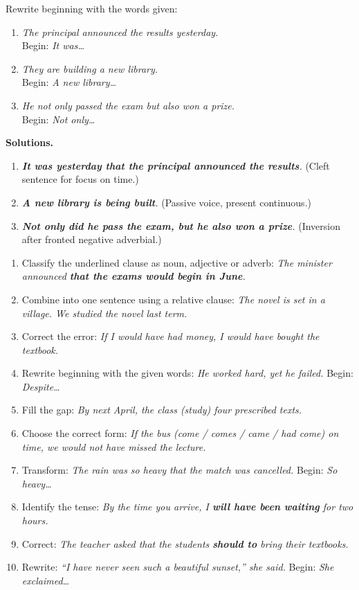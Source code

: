 \documentclass[11pt]{article}
\begin{document}
\begin{exoresolu}
Rewrite beginning with the words given:
\begin{enumerate}
\item \emph{The principal announced the results yesterday.} \\ Begin: \emph{It was\ldots}
\item \emph{They are building a new library.} \\ Begin: \emph{A new library\ldots}
\item \emph{He not only passed the exam but also won a prize.} \\ Begin: \emph{Not only\ldots}
\end{enumerate}
\tcblower
\textbf{Solutions.}
\begin{enumerate}
\item \emph{\textbf{It was yesterday that the principal announced the results}.} (Cleft sentence for focus on time.)
\item \emph{\textbf{A new library is being built}.} (Passive voice, present continuous.)
\item \emph{\textbf{Not only did he pass the exam, but he also won a prize}.} (Inversion after fronted negative adverbial.)
\end{enumerate}
\end{exoresolu}

\begin{exercice}
\begin{enumerate}
\item Classify the underlined clause as noun, adjective or adverb: \emph{The minister announced \textbf{that the exams would begin in June}.}
\item Combine into one sentence using a relative clause: \emph{The novel is set in a village. We studied the novel last term.}
\item Correct the error: \emph{If I would have had money, I would have bought the textbook.}
\item Rewrite beginning with the given words: \emph{He worked hard, yet he failed.} Begin: \emph{Despite\ldots}
\item Fill the gap: \emph{By next April, the class \underline{\hspace{2cm}} (study) four prescribed texts.}
\item Choose the correct form: \emph{If the bus (come / comes / came / had come) on time, we would not have missed the lecture.}
\item Transform: \emph{The rain was so heavy that the match was cancelled.} Begin: \emph{So heavy\ldots}
\item Identify the tense: \emph{By the time you arrive, I \textbf{will have been waiting} for two hours.}
\item Correct: \emph{The teacher asked that the students \textbf{should to} bring their textbooks.}
\item Rewrite: \emph{``I have never seen such a beautiful sunset,'' she said.} Begin: \emph{She exclaimed\ldots}
\end{enumerate}
\end{exercice}
\end{document}

